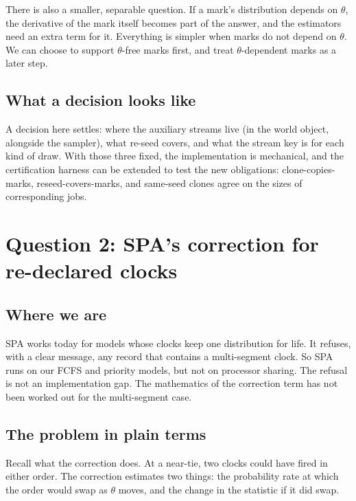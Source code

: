 \documentclass[11pt]{article}
\begin{document}
There is also a smaller, separable question. If a mark's distribution
depends on $\theta$, the derivative of the mark itself becomes part of the
answer, and the estimators need an extra term for it. Everything is
simpler when marks do not depend on $\theta$. We can choose to support
$\theta$-free marks first, and treat $\theta$-dependent marks as a later
step.

\subsection{What a decision looks like}

A decision here settles: where the auxiliary streams live (in the world
object, alongside the sampler), what re-seed covers, and what the stream
key is for each kind of draw. With those three fixed, the implementation
is mechanical, and the certification harness can be extended to test the
new obligations: clone-copies-marks, reseed-covers-marks, and same-seed
clones agree on the sizes of corresponding jobs.

\section{Question 2: SPA's correction for re-declared clocks}

\subsection{Where we are}

SPA works today for models whose clocks keep one distribution for life. It
refuses, with a clear message, any record that contains a multi-segment
clock. So SPA runs on our FCFS and priority models, but not on processor
sharing. The refusal is not an implementation gap. The mathematics of the
correction term has not been worked out for the multi-segment case.

\subsection{The problem in plain terms}

Recall what the correction does. At a near-tie, two clocks could have
fired in either order. The correction estimates two things: the
probability rate at which the order would swap as $\theta$ moves, and the
change in the statistic if it did swap.
\end{document}
